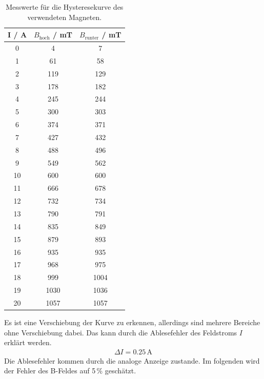 \begin{table}[H] %
  \centering
  \caption{Messwerte für die Hysteresekurve des verwendeten Magneten.}
  \label{tab:Hysterese}
  \begin{tabular}{c | c c}
    I / A & $B_\text{hoch}$ / mT & $B_\text{runter}$ / mT \\
    \hline
    0 & 4 & 7 \\
    1 & 61 & 58 \\
    2 & 119 & 129 \\
    3 & 178 & 182 \\
    4 & 245 & 244 \\
    5 & 300 & 303 \\
    6 & 374 & 371 \\
    7 & 427 & 432 \\
    8 & 488 & 496 \\
    9 & 549 & 562 \\
    10 & 600 & 600 \\
    11 & 666 & 678 \\
    12 & 732 & 734 \\
    13 & 790 & 791 \\
    14 & 835 & 849 \\
    15 & 879 & 893 \\
    16 & 935 & 935 \\
    17 & 968 & 975 \\
    18 & 999 & 1004 \\
    19 & 1030 & 1036 \\
    20 & 1057 & 1057 \\
  \end{tabular}
\end{table}

Es ist eine Verschiebung der Kurve zu erkennen, allerdings sind mehrere Bereiche ohne Verschiebung dabei. Das kann durch die Ablesefehler des Feldstroms $I$ erklärt werden.
\begin{align*}
  \Delta I = 0.25\, \text{A}
\end{align*}
Die Ablesefehler kommen durch die analoge Anzeige zustande. Im folgenden wird der Fehler des B-Feldes auf 5\,\% geschätzt.



